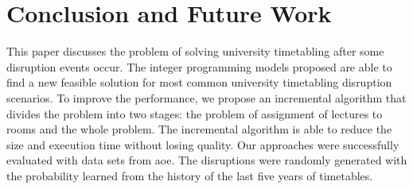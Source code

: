 \documentclass[runningheads]{llncs}
\newcommand{\uni}{\gls{aoe}}
\begin{document}
\section{Conclusion and Future Work}\label{sec:con}

This paper discusses the problem of solving university timetabling after some disruption events occur. The integer programming models proposed are able to find a new feasible solution for most common university timetabling disruption scenarios. 
%
To improve the performance, we propose an incremental algorithm that divides the problem into two stages: the problem of assignment of lectures to rooms and the whole problem. The incremental algorithm is able to reduce the size and execution time without losing quality. 
%
Our approaches were successfully evaluated with data sets from \uni. The disruptions were randomly generated with the probability learned from the history of the last five years of timetables. 


\end{document}
